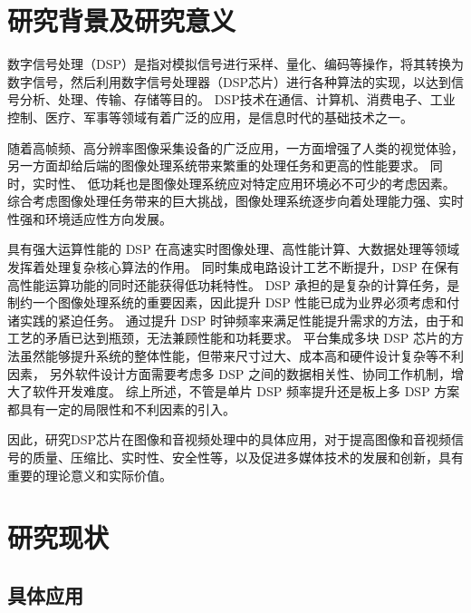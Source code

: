 \documentclass{math201}
\begin{document}

\makecover


\section{研究背景及研究意义}

数字信号处理（DSP）是指对模拟信号进行采样、量化、编码等操作，将其转换为数字信号，然后利用数字信号处理器（DSP芯片）进行各种算法的实现，以达到信号分析、处理、传输、存储等目的。
DSP技术在通信、计算机、消费电子、工业控制、医疗、军事等领域有着广泛的应用，是信息时代的基础技术之一。

随着高帧频、高分辨率图像采集设备的广泛应用，一方面增强了人类的视觉体验，另一方面却给后端的图像处理系统带来繁重的处理任务和更高的性能要求。
同时，实时性、 低功耗也是图像处理系统应对特定应用环境必不可少的考虑因素。
综合考虑图像处理任务带来的巨大挑战，图像处理系统逐步向着处理能力强、实时性强和环境适应性方向发展。\cite{1013149600.nh}

具有强大运算性能的 DSP 在高速实时图像处理、高性能计算、大数据处理等领域发挥着处理复杂核心算法的作用。
同时集成电路设计工艺不断提升，DSP 在保有高性能运算功能的同时还能获得低功耗特性。
DSP 承担的是复杂的计算任务，是制约一个图像处理系统的重要因素，因此提升 DSP 性能已成为业界必须考虑和付诸实践的紧迫任务。
通过提升 DSP 时钟频率来满足性能提升需求的方法，由于和工艺的矛盾已达到瓶颈，无法兼顾性能和功耗要求。
平台集成多块 DSP 芯片的方法虽然能够提升系统的整体性能，但带来尺寸过大、成本高和硬件设计复杂等不利因素，
另外软件设计方面需要考虑多 DSP 之间的数据相关性、协同工作机制，增大了软件开发难度。
综上所述，不管是单片 DSP 频率提升还是板上多 DSP 方案都具有一定的局限性和不利因素的引入。\cite{1014042501.nh}

因此，研究DSP芯片在图像和音视频处理中的具体应用，对于提高图像和音视频信号的质量、压缩比、实时性、安全性等，以及促进多媒体技术的发展和创新，具有重要的理论意义和实际价值。

\section{研究现状}

\subsection{具体应用}
\end{document}
